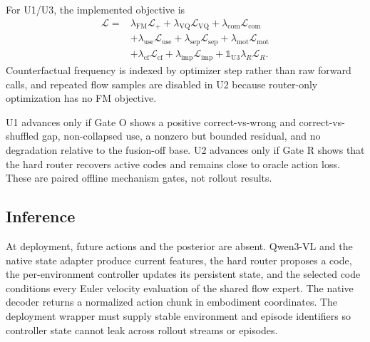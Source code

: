 For U1/U3, the implemented objective is
\begin{equation}
\begin{split}
    \mathcal{L}={}&
      \lambda_{\mathrm{FM}}\mathcal{L}_{+}
      +\lambda_{\mathrm{VQ}}\mathcal{L}_{\mathrm{VQ}}
      +\lambda_{\mathrm{com}}\mathcal{L}_{\mathrm{com}}\\
      &+\lambda_{\mathrm{use}}\mathcal{L}_{\mathrm{use}}
      +\lambda_{\mathrm{sep}}\mathcal{L}_{\mathrm{sep}}
      +\lambda_{\mathrm{mot}}\mathcal{L}_{\mathrm{mot}}\\
      &+\lambda_{\mathrm{cf}}\mathcal{L}_{\mathrm{cf}}
      +\lambda_{\mathrm{imp}}\mathcal{L}_{\mathrm{imp}}
      +\mathbb{1}_{\mathrm{U3}}\lambda_R\mathcal{L}_R .
    \label{eq:total-objective}
\end{split}
\end{equation}
Counterfactual frequency is indexed by optimizer step rather than raw forward
calls, and repeated flow samples are disabled in U2 because router-only
optimization has no FM objective.



U1 advances only if Gate O shows a positive correct-vs-wrong and
correct-vs-shuffled gap, non-collapsed use, a nonzero but bounded residual, and
no degradation relative to the fusion-off base.  U2 advances only if Gate R
shows that the hard router recovers active codes and remains close to oracle
action loss.  These are paired offline mechanism gates, not rollout results.

\subsection{Inference}

At deployment, future actions and the posterior are absent.  Qwen3-VL and the
native state adapter produce current features, the hard router proposes a code,
the per-environment controller updates its persistent state, and the selected
code conditions every Euler velocity evaluation of the shared flow expert.
The native decoder returns a normalized action chunk in embodiment coordinates.
The deployment wrapper must supply stable environment and episode identifiers
so controller state cannot leak across rollout streams or episodes.
